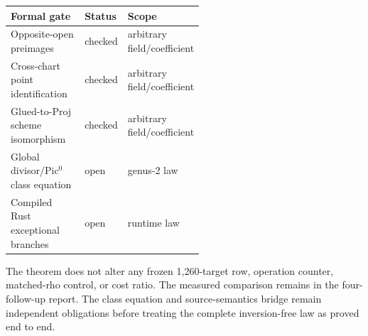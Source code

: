 \documentclass[11pt]{article}
\begin{document}
\begin{center}
\begin{tabular}{>{\raggedright\arraybackslash}p{0.54\linewidth}ll}
\hline
Formal gate & Status & Scope \\
\hline
Opposite-open preimages & checked & arbitrary field/coefficient \\
Cross-chart point identification & checked & arbitrary field/coefficient \\
Glued-to-Proj scheme isomorphism & checked & arbitrary field/coefficient \\
Global divisor/Pic$^0$ class equation & open & genus-2 law \\
Compiled Rust exceptional branches & open & runtime law \\
\hline
\end{tabular}
\end{center}

The theorem does not alter any frozen 1,260-target row, operation counter, matched-rho control, or cost ratio. The measured comparison remains in the four-follow-up report. The class equation and source-semantics bridge remain independent obligations before treating the complete inversion-free law as proved end to end.
\end{document}
